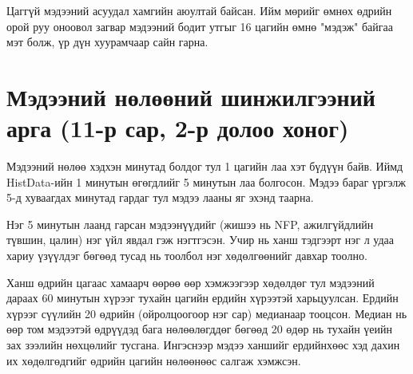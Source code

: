 Цаггүй мэдээний асуудал хамгийн аюултай байсан. Ийм мөрийг өмнөх өдрийн орой руу оноовол загвар мэдээний бодит
утгыг 16 цагийн өмнө "мэдэж" байгаа мэт болж, үр дүн хуурамчаар сайн гарна.

\section{Мэдээний нөлөөний шинжилгээний арга (11-р сар, 2-р долоо хоног)}
Мэдээний нөлөө хэдхэн минутад болдог тул \cite{andersen2003micro} 1 цагийн лаа хэт бүдүүн байв. Иймд HistData-ийн
1 минутын өгөгдлийг 5 минутын лаа болгосон. Мэдээ бараг үргэлж 5-д хуваагдах минутад гардаг тул мэдээ лааны яг
эхэнд таарна.

Нэг 5 минутын лаанд гарсан мэдээнүүдийг (жишээ нь NFP, ажилгүйдлийн түвшин, цалин) нэг үйл явдал гэж нэгтгэсэн.
Учир нь ханш тэдгээрт нэг л удаа хариу үзүүлдэг бөгөөд тусад нь тоолбол нэг хөдөлгөөнийг давхар тоолно.

Ханш өдрийн цагаас хамаарч өөрөө өөр хэмжээгээр хөдөлдөг тул мэдээний дараах 60 минутын хүрээг тухайн цагийн ердийн
хүрээтэй харьцуулсан. Ердийн хүрээг сүүлийн 20 өдрийн (ойролцоогоор нэг сар) медианаар тооцсон. Медиан нь өөр том
мэдээтэй өдрүүдэд бага нөлөөлөгддөг бөгөөд 20 өдөр нь тухайн үеийн зах зээлийн нөхцөлийг тусгана. Ингэснээр мэдээ
ханшийг ердийнхөөс хэд дахин их хөдөлгөдгийг өдрийн цагийн нөлөөнөөс салгаж хэмжсэн.